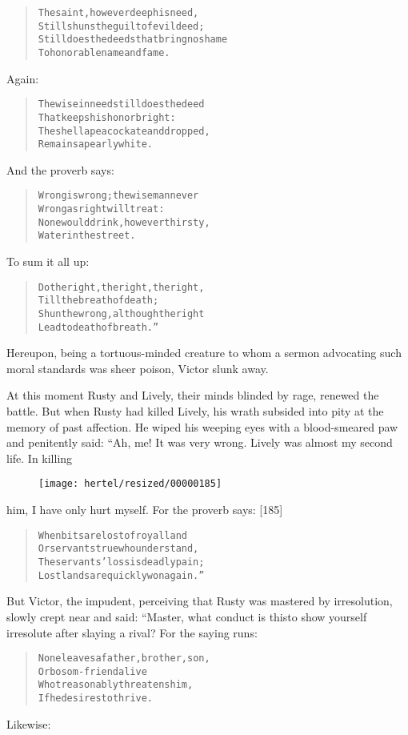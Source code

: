 \documentclass[article, twoside, 10pt]{memoir}
\renewenvironment{verbatim}{%
\begin{quote}%
\vskip -10pt%
\begin{alltt}\normalfont\small}{\end{alltt}%
\end{quote}%
\vskip -10pt
} %
\begin{document}
\begin{verbatim}
The saint, however deep his need,
Still shuns the guilt of evil deed;
Still does the deeds that bring no shame
To honorable name and fame.
\end{verbatim}
Again:

\begin{verbatim}
The wise in need still does the deed
    That keeps his honor bright:
The shell a peacock ate and dropped,
    Remains a pearly white.
\end{verbatim}
And the proverb says:

\begin{verbatim}
Wrong is wrong; the wise man never
    Wrong as right will treat:
None would drink, however thirsty,
    Water in the street.
\end{verbatim}
To sum it all up:

\begin{verbatim}
Do the right, the right, the right,
    Till the breath of death;
Shun the wrong, although the right
    Lead to death of breath.”
\end{verbatim}
Hereupon, being a tortuous-minded creature to whom a sermon
advocating such moral standards was sheer poison, Victor slunk
away.

At this moment Rusty and Lively, their minds blinded by rage,
renewed the battle. But when Rusty had killed Lively, his wrath
subsided into pity at the memory of past affection. He wiped his
weeping eyes with a blood-smeared paw and penitently said: “Ah, me!
It was very wrong. Lively was almost my second life. In killing
\begin{figure}[p]\texttt{[image: hertel/resized/00000185]}\end{figure}him, I have only hurt myself. For the proverb says: [185]

\begin{verbatim}
When bits are lost of royal land
Or servants true who understand,
The servants' loss is deadly pain;
Lost lands are quickly won again.”
\end{verbatim}
But Victor, the impudent, perceiving that Rusty was mastered by
irresolution, slowly crept near and said: “Master, what conduct is
this{\textemdash}to show yourself irresolute after slaying a rival? For the
saying runs:

\begin{verbatim}
None leaves a father, brother, son,
    Or bosom-friend alive
Who treasonably threatens him,
    If he desires to thrive.
\end{verbatim}
Likewise:
\end{document}
